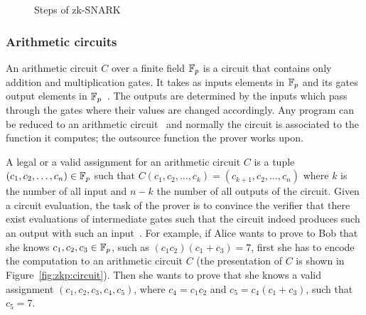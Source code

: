 \begin{figure}[ht!]
  \center
  \caption{Steps of zk-SNARK}
  \label{fig:zkp:zksnark_flow}
\end{figure}

\subsubsection{Arithmetic circuits}
\label{zkp:snarks:circuits}

An arithmetic circuit $C$ over a finite field $\mathbb{F}_p$ is a circuit that contains
only addition and multiplication gates. It takes as inputs elements in $\mathbb{F}_p$ and its gates output elements in $\mathbb{F}_p$~\cite{184425, zcash}. The outputs are determined by the inputs which pass through the gates where their values are changed accordingly. Any program  can be reduced to  an arithmetic circuit~\cite{pankova_succinct_2013, 10.1007/978-3-642-40084-1_6} and normally the circuit is associated to the function it computes; the outsource function the prover works upon.

A legal or a valid assignment for an arithmetic circuit $C$ is a tuple $(c_1, c_2, \dots, c_n) \in \mathbb{F}_p$ such that $C(c_1, c_2, \dots, c_k) = (c_{k+1}, c_2, \dots, c_n)$ where $k$ is the number of all input and $n - k$ the number of all outputs of the circuit. Given a circuit evaluation, the task of the prover is to convince the verifier that there exist evaluations of intermediate gates such that the circuit indeed produces such an output with such an input~\cite{pankova_succinct_2013}. For example, if Alice wants to prove to Bob that she knows $c_1, c_2, c_3 \in \mathbb{F}_p$, such as $(c_{1}c_{2})(c_1 + c_3) = 7$, first she has to encode the computation to an arithmetic circuit $C$ (the presentation of $C$ is shown in Figure~\ref{fig:zkp:circuit}). Then she wants to prove that she knows a valid assignment $(c_1, c_2, c_3, c_4, c_5)$, where $c_4 = c_{1}c_{2}$ and $c_5 = c_{4}(c_1 + c_3)$, such that $c_5 = 7$.

